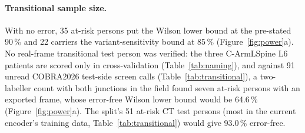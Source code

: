 \paragraph{Transitional sample size.}
With no error, 35 at-risk persons put the Wilson lower bound at the pre-stated 90\,\% and 22 carriers the
variant-sensitivity bound at 85\,\% (Figure~\ref{fig:power}a). No real-frame transitional test person was
verified: the three C-ArmLSpine L6 patients are scored only in cross-validation (Table~\ref{tab:naming}), and
against 91 unread COBRA2026 test-side screen calls (Table~\ref{tab:transitional}), a two-labeller count with both
junctions in the field found seven at-risk persons with an exported frame, whose error-free Wilson lower bound
would be 64.6\,\% (Figure~\ref{fig:power}a). The split's 51 at-risk CT test persons (most in the current
encoder's training data, Table~\ref{tab:transitional}) would give 93.0\,\% error-free.
